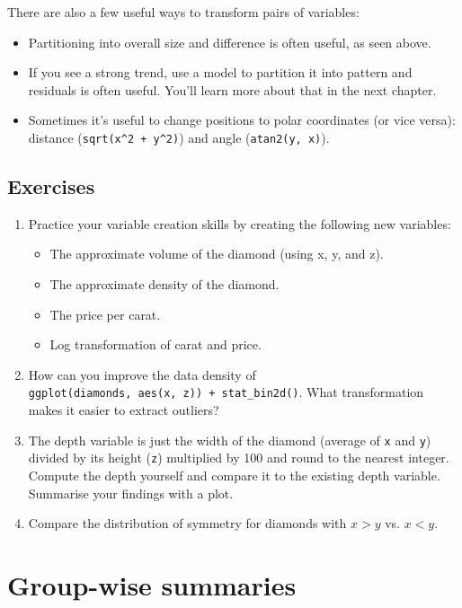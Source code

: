 There are also a few useful ways to transform pairs of variables:

\begin{itemize}
\item
  Partitioning into overall size and difference is often useful, as seen
  above.
\item
  If you see a strong trend, use a model to partition it into pattern
  and residuals is often useful. You'll learn more about that in the
  next chapter.
\item
  Sometimes it's useful to change positions to polar coordinates (or
  vice versa): distance (\texttt{sqrt(x\^{}2\ +\ y\^{}2)}) and angle
  (\texttt{atan2(y,\ x)}).
\end{itemize}

\subsection{Exercises}\label{exercises-1}

\begin{enumerate}
\def\labelenumi{\arabic{enumi}.}
\item
  Practice your variable creation skills by creating the following new
  variables:

  \begin{itemize}
  \tightlist
  \item
    The approximate volume of the diamond (using x, y, and z).
  \item
    The approximate density of the diamond.
  \item
    The price per carat.
  \item
    Log transformation of carat and price.
  \end{itemize}
\item
  How can you improve the data density of
  \texttt{ggplot(diamonds,\ aes(x,\ z))\ +\ stat\_bin2d()}. What
  transformation makes it easier to extract outliers?
\item
  The depth variable is just the width of the diamond (average of
  \texttt{x} and \texttt{y}) divided by its height (\texttt{z})
  multiplied by 100 and round to the nearest integer. Compute the depth
  yourself and compare it to the existing depth variable. Summarise your
  findings with a plot.
\item
  Compare the distribution of symmetry for diamonds with \(x > y\) vs.
  \(x < y\).
\end{enumerate}

\section{Group-wise summaries}\label{sec:summarise}


